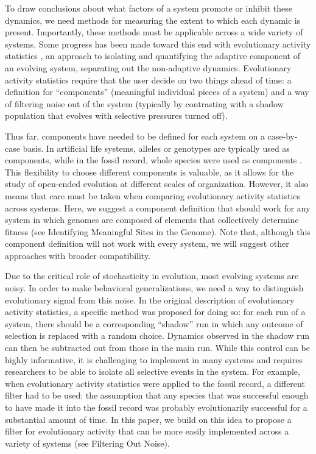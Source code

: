 \documentclass[letterpaper]{article}
\begin{document}
To draw conclusions about what factors of a system promote or inhibit these dynamics, we need methods for measuring the extent to which each dynamic is present. Importantly, these methods must be applicable across a wide variety of systems. Some progress has been made toward this end with evolutionary activity statistics \citep{bedau_classification_1998, channon_passing_2001}, an approach to isolating and quantifying the adaptive component of an evolving system, separating out the non-adaptive dynamics. Evolutionary activity statistics require that the user decide on two things ahead of time: a definition for ``components'' (meaningful individual pieces of a system) and a way of filtering noise out of the system (typically by contrasting with a shadow population that evolves with selective pressures turned off). 

Thus far, components have needed to be defined for each system on a case-by-case basis.  In artificial life systems, alleles or genotypes are typically used as components, while in the fossil record, whole species were used as components \citep{bedau_classification_1998}.
This flexibility to choose different components is valuable, as it allows for the study of open-ended evolution at different scales of organization. However, it also means that care must be taken when comparing evolutionary activity statistics across systems. Here, we suggest a component definition that should work for any system in which genomes are composed of elements that collectively determine fitness (see Identifying Meaningful Sites in the Genome). Note that, although this component definition will not work with every system, we will suggest other approaches with broader compatibility.

Due to the critical role of stochasticity in evolution, most evolving systems are noisy. In order to make behavioral generalizations, we need a way to distinguish evolutionary signal from this noise. In the original description of evolutionary activity statistics, a specific method was proposed for doing so: for each run of a system, there should be a corresponding ``shadow'' run in which any outcome of selection is replaced with a random choice. Dynamics observed in the shadow run can then be subtracted out from those in the main run. While this control can be highly informative, it is challenging to implement in many systems and requires researchers to be able to isolate all selective events in the system. For example, when evolutionary activity statistics were applied to the fossil record, a different filter had to be used: the assumption that any species that was successful enough to have made it into the fossil record was probably evolutionarily successful for a substantial amount of time. In this paper, we build on this idea to propose a filter for evolutionary activity that can be more easily implemented across a variety of systems (see Filtering Out Noise).
\end{document}
